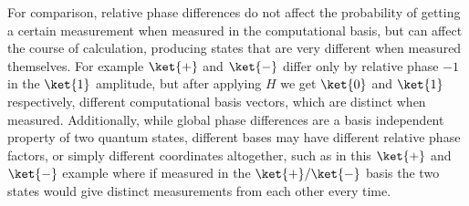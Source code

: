 For comparison, relative phase differences do not affect the probability of getting a certain measurement when measured in the computational basis, but can affect the course of calculation, producing states that are very different when measured themselves. For example $\ket{+}$ and $\ket{-}$ differ only by relative phase $-1$ in the $\ket{1}$ amplitude, but after applying $H$ we get $\ket{0}$ and $\ket{1}$ respectively, different computational basis vectors, which are distinct when measured. Additionally, while global phase differences are a basis independent property of two quantum states, different bases may have different relative phase factors, or simply different coordinates altogether, such as in this $\ket{+}$ and $\ket{-}$ example where if measured in the $\ket{+}/\ket{-}$ basis the two states would give distinct measurements from each other every time.

